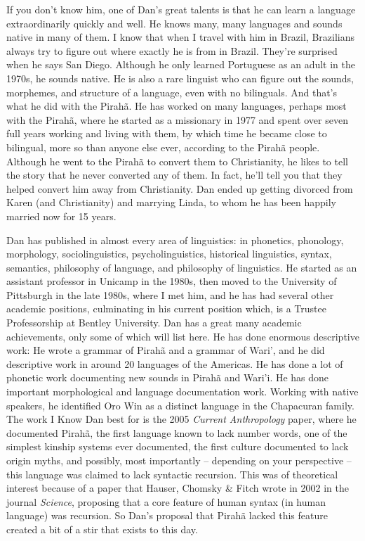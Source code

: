 \begin{refsection}
If you don't know him, one of Dan's great talents is that he can learn a language extraordinarily quickly and well. He knows many, many languages and sounds native in many of them. I know that when I travel with him in Brazil, Brazilians always try to figure out where exactly he is from in Brazil. They're surprised when he says San Diego. Although he only learned Portuguese as an adult in the 1970s, he sounds native. He is also a rare linguist who can figure out the sounds, morphemes, and structure of a language, even with no bilinguals. And that's what he did with the Pirahã. He has worked on many languages, perhaps most with the Pirahã, where he started as a missionary in 1977 and spent over seven full years working and living with them, by which time he became close to bilingual, more so than anyone else ever, according to the Pirahã people. Although he went to the Pirahã to convert them to Christianity, he likes to tell the story that he never converted any of them. In fact, he'll tell you that they helped convert him away from Christianity. Dan ended up getting divorced from Karen (and Christianity) and marrying Linda, to whom he has been happily married now for 15 years. 

Dan has published in almost every area of linguistics: in phonetics, phonology, morphology, sociolinguistics, psycholinguistics, historical linguistics, syntax, semantics, philosophy of language, and philosophy of linguistics. He started as an assistant professor in Unicamp in the 1980s, then moved to the University of Pittsburgh in the late 1980s, where I met him, and he has had several other academic positions, culminating in his current position which, is a Trustee Professorship at  Bentley University. Dan has a great many academic achievements, only some of which will list here. He has done enormous descriptive work: He wrote  a grammar of Pirahã and a grammar of Wari', and he did descriptive work in around 20 languages of the Americas. He has done a lot of phonetic work documenting new sounds in Pirahã and Wari'i. He has done important morphological and language documentation work. Working with native speakers, he identified Oro Win as a distinct language in the Chapacuran family. The work I Know Dan best for is the 2005 \textit{Current Anthropology} paper, where he documented Pirahã, the first language known to lack number words, one of the simplest kinship systems ever documented, the first culture documented to lack origin myths, and possibly, most importantly -- depending on your perspective -- this language was claimed to lack syntactic recursion. This was of theoretical interest because of a paper that Hauser, Chomsky \& Fitch wrote in 2002 in the journal \textit{Science}, proposing that a core feature of human syntax (in human language) was recursion. So Dan's proposal that Pirahã lacked this feature created a bit of a stir that exists to this day.


\end{refsection}
